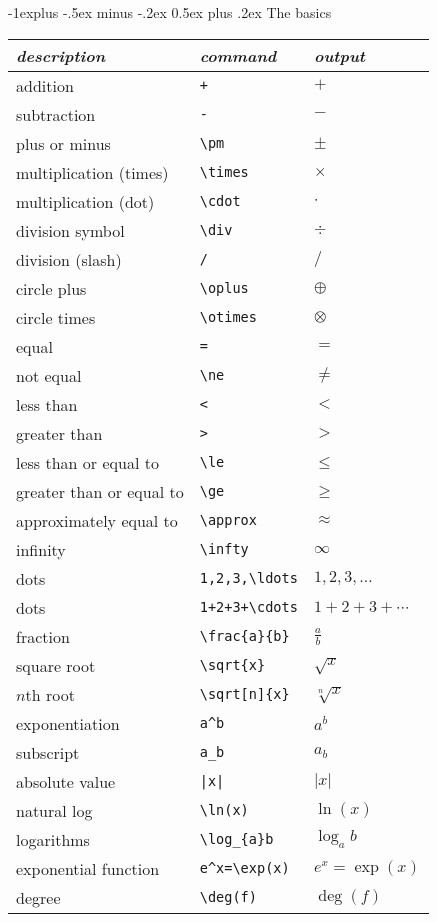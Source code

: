 \documentclass[10pt,landscape,letterpaper]{article}
\makeatletter
\renewcommand{\subsection}{\@startsection{subsection}{2}{0mm}%
                                {-1explus -.5ex minus -.2ex}%
                                {0.5ex plus .2ex}%
                                {\sffamily\normalsize\itshape}}
\makeatother
\begin{document}
\begin{multicols}{3}
\subsection{The basics}
\begin{tabular}{lll}
\toprule
\emph{description} & \emph{command} & \emph{output}\\
\midrule
addition & \verb!+! & $+$\\
subtraction & \verb!-! & $-$\\
plus or minus & \verb!\pm! & $\pm$\\
multiplication (times) & \verb!\times! & $\times$\\
multiplication (dot) & \verb!\cdot! & $\cdot$\\
division symbol & \verb!\div! & $\div$\\
division (slash) & \verb!/! & $/$\\
circle plus & \verb!\oplus! & $\oplus$\\
circle times & \verb!\otimes! & $\otimes$\\
equal & \verb!=! & $=$\\
not equal & \verb!\ne! & $\ne$\\
less than & \verb!<! & $<$\\
greater than & \verb!>! & $>$\\
less than or equal to & \verb!\le! & $\le$\\
greater than or equal to & \verb!\ge! & $\ge$\\
approximately equal to & \verb!\approx! & $\approx$\\
infinity & \verb!\infty! & $\infty$\\
dots & \verb!1,2,3,\ldots! & $1,2,3,\ldots$\\
dots & \verb!1+2+3+\cdots! & $1+2+3+\cdots$\\
fraction & \verb!\frac{a}{b}! & $\frac{a}{b}$\\
square root & \verb!\sqrt{x}! & $\sqrt{x}$\\
$n$th root & \verb!\sqrt[n]{x}! & $\sqrt[n]{x}$\\
exponentiation & \verb!a^b! & $a^{b}$\\
subscript & \verb!a_b! & $a_{b}$\\
absolute value & \verb!|x|! & $|x|$\\
natural log  & \verb!\ln(x)! & $\ln(x)$\\
logarithms & \verb!\log_{a}b! & $\log_{a}b$\\
exponential function & \verb!e^x=\exp(x)! & $e^{x}=\exp(x)$\\
degree & \verb!\deg(f)! & $\deg(f)$\\
\bottomrule
\end{tabular}
\vfill
\newpage


\end{multicols}
\end{document}
